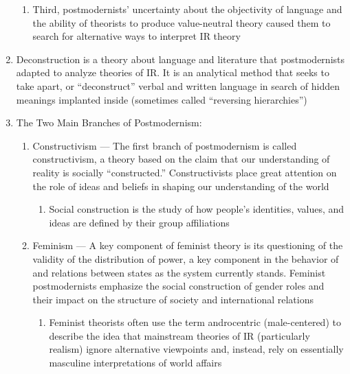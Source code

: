 \documentclass[12pt]{article}
\begin{document}
\begin{enumerate}
\begin{enumerate}
          \item Third, postmodernists' uncertainty about the objectivity of language and the ability of theorists to produce value-neutral theory caused them to search for alternative ways to interpret IR theory

        \end{enumerate}

      \item Deconstruction is a theory about language and literature that postmodernists adapted to analyze theories of IR. It is an analytical method that seeks to take apart, or “deconstruct” verbal and written language in search of hidden meanings implanted inside (sometimes called “reversing hierarchies”)

      \item The Two Main Branches of Postmodernism:

        \begin{enumerate}

          \item Constructivism — The first branch of postmodernism is called constructivism, a theory based on the claim that our understanding of reality is socially “constructed.” Constructivists place great attention on the role of ideas and beliefs in shaping our understanding of the world

            \begin{enumerate}

              \item Social construction is the study of how people's identities, values, and ideas are defined by their group affiliations

            \end{enumerate}

          \item Feminism — A key component of feminist theory is its questioning of the validity of the distribution of power, a key component in the behavior of and relations between states as the system currently stands. Feminist postmodernists emphasize the social construction of gender roles and their impact on the structure of society and international relations

            \begin{enumerate}

              \item Feminist theorists often use the term androcentric (male-centered) to describe the idea that mainstream theories of IR (particularly realism) ignore alternative viewpoints and, instead, rely on essentially masculine interpretations of world affairs


\end{enumerate}
\end{enumerate}
\end{enumerate}
\end{document}

